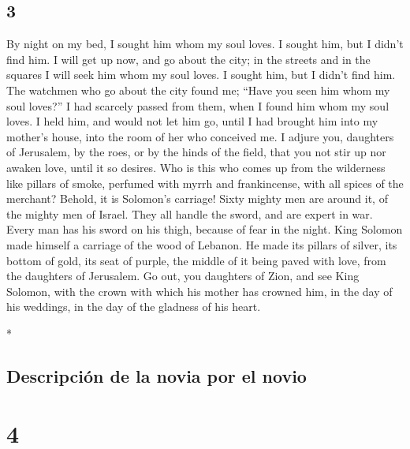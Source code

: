 \begin{paracol}{2}
\begin{otherlanguage}{english}
\hypertarget{section-5}{%
\section{3}\label{section-5}}

 By night on my bed, I sought him whom my soul loves. I
sought him, but I didn't find him.  I will get up now, and
go about the city; in the streets and in the squares I will seek him
whom my soul loves. I sought him, but I didn't find him. 
The watchmen who go about the city found me; ``Have you seen him whom my
soul loves?''  I had scarcely passed from them, when I
found him whom my soul loves. I held him, and would not let him go,
until I had brought him into my mother's house, into the room of her who
conceived me.  I adjure you, daughters of Jerusalem, by
the roes, or by the hinds of the field, that you not stir up nor awaken
love, until it so desires.  Who is this who comes up from
the wilderness like pillars of smoke, perfumed with myrrh and
frankincense, with all spices of the merchant?  Behold, it
is Solomon's carriage! Sixty mighty men are around it, of the mighty men
of Israel.  They all handle the sword, and are expert in
war. Every man has his sword on his thigh, because of fear in the night.
 King Solomon made himself a carriage of the wood of
Lebanon.  He made its pillars of silver, its bottom of
gold, its seat of purple, the middle of it being paved with love, from
the daughters of Jerusalem.  Go out, you daughters of
Zion, and see King Solomon, with the crown with which his mother has
crowned him, in the day of his weddings, in the day of the gladness of
his heart.

\end{otherlanguage}

\switchcolumn[0]*

\hypertarget{descripciuxf3n-de-la-novia-por-el-novio}{%
\subsection{Descripción de la novia por el
novio}\label{descripciuxf3n-de-la-novia-por-el-novio}}

\hypertarget{section-6}{%
\section{4}\label{section-6}}


\end{paracol}
